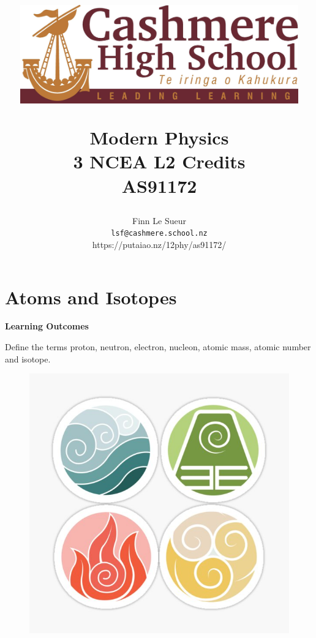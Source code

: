 \documentclass[12pt]{report}
\title{
	\centerline{\includegraphics[width=120mm]{assets/lymphad.jpg}}
	\vspace{2cm}
	\Huge{Modern Physics}\\
	\large{3 NCEA L2 Credits \\ AS91172}
}
\author{Finn Le Sueur \\ \texttt{lsf@cashmere.school.nz} \\ https://putaiao.nz/12phy/as91172/}
\date{
	\vspace{2cm}
	\the\year{}
	\vspace{2cm}
}
\begin{document}
\maketitle

\newpage


\newpage
\setcounter{tocdepth}{1}
\tableofcontents

\newpage
\chapter{Atoms and Isotopes}

\noindent\textbf{Learning Outcomes}
\begin{nwa}
	\item Define the terms proton, neutron, electron, nucleon, atomic mass, atomic number and isotope.
\end{nwa}

\begin{figure}
	\vspace{-1cm}
	\begin{center}
		\includegraphics[width=0.9\linewidth]{four-nations.jpg}
	\end{center}
\end{figure}
\end{document}
